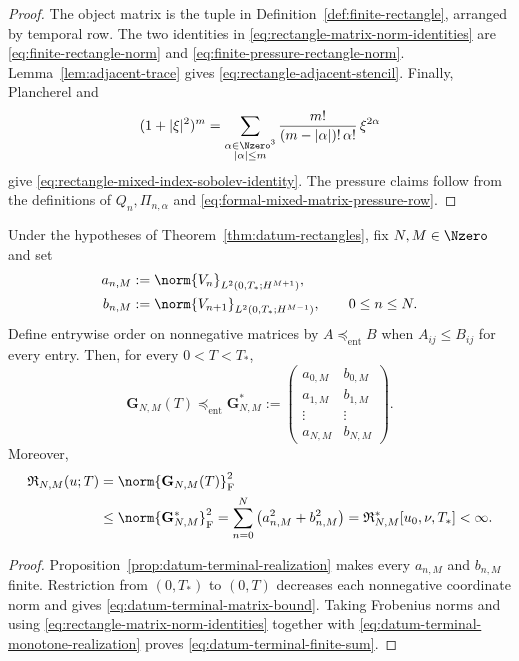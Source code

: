 \begin{proof}
The object matrix is the tuple in Definition~\ref{def:finite-rectangle},
arranged by temporal row.  The two identities in
\eqref{eq:rectangle-matrix-norm-identities} are
\eqref{eq:finite-rectangle-norm} and
\eqref{eq:finite-pressure-rectangle-norm}.  Lemma~\ref{lem:adjacent-trace}
gives \eqref{eq:rectangle-adjacent-stencil}.  Finally, Plancherel and
\[
 (1+|\xi|^2)^m
 =\sum_{\substack{\alpha\in\Nzero^3\\|\alpha|\le m}}
   \frac{m!}{(m-|\alpha|)!\,\alpha!}\,\xi^{2\alpha}
\]
give \eqref{eq:rectangle-mixed-index-sobolev-identity}.  The pressure claims
follow from the definitions of \(Q_n,\Pi_{n,\alpha}\) and
\eqref{eq:formal-mixed-matrix-pressure-row}.
\end{proof}

\begin{proposition}
\label{prop:datum-terminal-matrix-consequence}
Under the hypotheses of Theorem~\ref{thm:datum-rectangles}, fix
\(N,M\in\Nzero\) and set
\begin{align}
 a_{n,M}
 &:=\norm{V_n}_{L^2(0,T_*;H^{M+1})},\notag\\
 b_{n,M}
 &:=\norm{V_{n+1}}_{L^2(0,T_*;H^{M-1})},
 \qquad 0\le n\le N.
 \label{eq:datum-terminal-coordinate-norms}
\end{align}
Define entrywise order on nonnegative matrices by
\(A\preceq_{\mathrm{ent}}B\) when \(A_{ij}\le B_{ij}\) for every entry.
Then, for every \(0<T<T_*\),
\begin{equation}
 \mathbf G_{N,M}(T)
 \preceq_{\mathrm{ent}}
 \mathbf G_{N,M}^*
 :=
 \begin{pmatrix}
  a_{0,M}&b_{0,M}\\
  a_{1,M}&b_{1,M}\\
  \vdots&\vdots\\
  a_{N,M}&b_{N,M}
 \end{pmatrix}.
 \label{eq:datum-terminal-matrix-bound}
\end{equation}
Moreover,
\begin{align}
 \mathfrak R_{N,M}(u;T)
 &=\norm{\mathbf G_{N,M}(T)}_{\mathrm F}^2\notag\\
 &\le\norm{\mathbf G_{N,M}^*}_{\mathrm F}^2
 =\sum_{n=0}^{N}\left(a_{n,M}^2+b_{n,M}^2\right)
 =\mathfrak R_{N,M}^*[u_0,\nu,T_*]<\infty.
 \label{eq:datum-terminal-finite-sum}
\end{align}
\end{proposition}

\begin{proof}
Proposition~\ref{prop:datum-terminal-realization} makes every
\(a_{n,M}\) and \(b_{n,M}\) finite.  Restriction from \((0,T_*)\) to
\((0,T)\) decreases each nonnegative coordinate norm and gives
\eqref{eq:datum-terminal-matrix-bound}.  Taking Frobenius norms and using
\eqref{eq:rectangle-matrix-norm-identities} together with
\eqref{eq:datum-terminal-monotone-realization} proves
\eqref{eq:datum-terminal-finite-sum}.
\end{proof}
